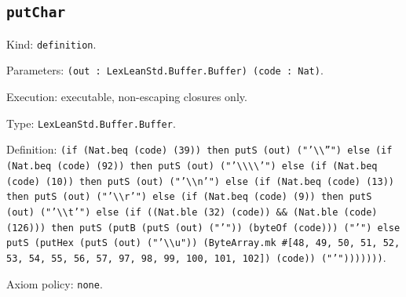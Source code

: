 \documentclass[11pt]{article}
\begin{document}
\subsection*{\texttt{putChar}}
\noindent Kind: \texttt{definition}.\par
\noindent Parameters: \texttt{(out : LexLeanStd.Buffer.Buffer) (code : Nat)}.\par
\noindent Execution: executable, non-escaping closures only.\par
\noindent Type: \texttt{LexLeanStd.Buffer.Buffer}.\par
\noindent Definition: \texttt{(if (Nat.beq (code) (39)) then putS (out) ("'\textbackslash{}\textbackslash{}''") else (if (Nat.beq (code) (92)) then putS (out) ("'\textbackslash{}\textbackslash{}\textbackslash{}\textbackslash{}'") else (if (Nat.beq (code) (10)) then putS (out) ("'\textbackslash{}\textbackslash{}n'") else (if (Nat.beq (code) (13)) then putS (out) ("'\textbackslash{}\textbackslash{}r'") else (if (Nat.beq (code) (9)) then putS (out) ("'\textbackslash{}\textbackslash{}t'") else (if ((Nat.ble (32) (code)) \&\& (Nat.ble (code) (126))) then putS (putB (putS (out) ("'")) (byteOf (code))) ("'") else putS (putHex (putS (out) ("'\textbackslash{}\textbackslash{}u")) (ByteArray.mk \#[48, 49, 50, 51, 52, 53, 54, 55, 56, 57, 97, 98, 99, 100, 101, 102]) (code)) ("'")))))))}.\par
\noindent Axiom policy: \texttt{none}.\par
\end{document}
